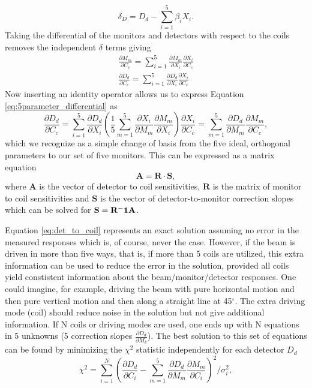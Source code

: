 \[
\delta_D = D_d-\sum_{i=1}^{5}\beta_iX_i.
\]  
Taking the differential of the monitors and detectors with respect to the coils removes the independent $\delta$ terms giving
\begin{eqnarray}
\frac{\partial M_m}{\partial C_c}=\sum_{i=1}^{5}\frac{\partial M_m}{\partial X_i}\frac{\partial X_i}{\partial C_c}\\
\frac{\partial D_d}{\partial C_c}=\sum_{i=1}^{5}\frac{\partial D_d}{\partial X_i}\frac{\partial X_i}{\partial C_c}
\label{eq:5parameter_differential}
\end{eqnarray}
Now inserting an identity operator allows us to express Equation \ref{eq:5parameter_differential} as
\begin{equation}
\frac{\partial D_d}{\partial C_c}=\sum_{i=1}^{5}\frac{\partial D_d}{\partial X_i}\left(\frac{1}{5}\sum_{m=1}^5\frac{\partial X_i}{\partial M_m}\frac{\partial M_m}{\partial X_i}\right)\frac{\partial X_i}{\partial C_c}=\sum_{m=1}^{5}\frac{\partial D_d}{\partial M_m}\frac{\partial M_m}{\partial C_c},
\label{eq:det_to_coil}
\end{equation}
which we recognize as a simple change of basis from the five ideal, orthogonal parameters to our set of five monitors. This can be expressed as a matrix equation
\[
\mathbf{A=R\cdot S},
\]
where $\mathbf A$ is the vector of detector to coil sensitivities, $\mathbf R$ is the matrix of monitor to coil sensitivities and  $\mathbf S$ is the vector of detector-to-monitor correction slopes which can be solved for ${\bf S=R^-1A}$. 

Equation \ref{eq:det_to_coil} represents an exact solution assuming no error in the measured responses which is, of course, never the case. However, if the beam is driven in more than five ways, that is, if more than 5 coils are utilized, this extra information can be used to reduce the error in the solution, provided all coils yield constistent information about the beam/monitor/detector responses. One could imagine, for example, driving the beam with pure horizontal motion and then pure vertical motion and then along a straight line at 45$^{\circ}$. The extra driving mode (coil) should reduce noise in the solution but not give additional information. If N coils or driving modes are used, one ends up with N equations in 5 unknowns (5 correction slopes $\frac{\partial D_d}{\partial M_k}$). The best solution to this set of equations can be found by minimizing the $\chi ^2$ statistic independently for each detector $D_d$
\begin{equation}
\chi^2=\sum_{i=1}^N\left(\frac{\partial D_d}{\partial C_i} - \sum_{m=1}^{5}\frac{\partial D_d}{\partial M_m}\frac{\partial M_m}{\partial C_i} \right)^2/\sigma_i^2,
\label{eq:chisquare}
\end{equation}

